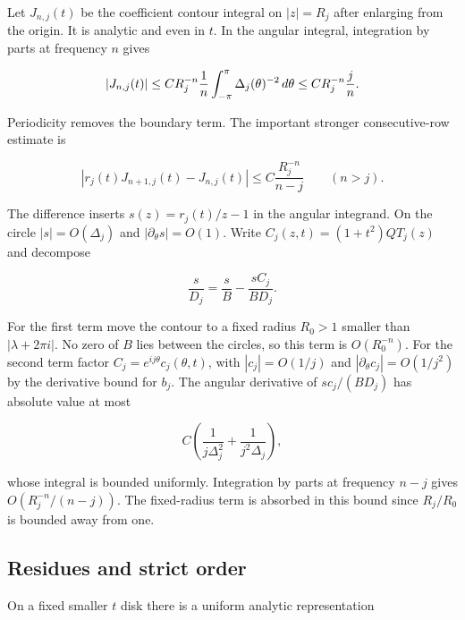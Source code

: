 \documentclass[11pt]{article}
\begin{document}
Let \(J_{n,j}(t)\) be the coefficient contour integral on \(|z|=R_j\) after enlarging from the origin. It is analytic and even in \(t\). In the angular integral, integration by parts at frequency \(n\) gives

\begin{equation*}
|J_{n,j}(t)|\le C R_j^{-n}\frac{1}{n}\int_{-\pi}^{\pi}\Delta_j(\theta)^{-2}\thinspace d\theta
\le C R_j^{-n}\frac{j}{n}.
\end{equation*}

Periodicity removes the boundary term. The important stronger consecutive-row estimate is

\begin{equation*}
|r_j(t)J_{n+1,j}(t)-J_{n,j}(t)|\le C\frac{R_j^{-n}}{n-j}\qquad(n>j).
\end{equation*}

The difference inserts \(s(z)=r_j(t)/z-1\) in the angular integrand. On the circle \(|s|=O(\Delta_j)\) and \(|\partial_\theta s|=O(1)\). Write \(C_j(z,t)=(1+t^2)QT_j(z)\) and decompose

\begin{equation*}
\frac{s}{D_j}=\frac{s}{B}-\frac{sC_j}{B D_j}.
\end{equation*}

For the first term move the contour to a fixed radius \(R_0>1\) smaller than \(|\lambda+2\pi i|\). No zero of \(B\) lies between the circles, so this term is \(O(R_0^{-n})\). For the second term factor \(C_j=e^{ij\theta} c_j(\theta,t)\), with \(|c_j|=O(1/j)\) and \(|\partial_\theta c_j|=O(1/j^2)\) by the derivative bound for \(b_j\). The angular derivative of \(s c_j/(B D_j)\) has absolute value at most

\begin{equation*}
C\left(\frac{1}{j\Delta_j^2}+\frac{1}{j^2\Delta_j}\right),
\end{equation*}

whose integral is bounded uniformly. Integration by parts at frequency \(n-j\) gives \(O(R_j^{-n}/(n-j))\). The fixed-radius term is absorbed in this bound since \(R_j/R_0\) is bounded away from one.

\subsection{Residues and strict order}
\label{sec:residues-and-strict-order}

On a fixed smaller \(t\) disk there is a uniform analytic representation
\end{document}
